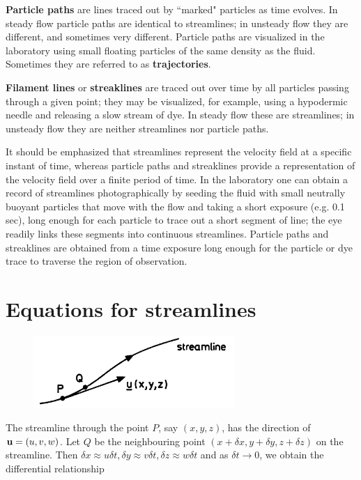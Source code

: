 \documentclass[twoside,a4paper,11pt]{report}
\begin{document}
\textbf{Particle paths} are lines traced out by ``marked" particles as time
evolves. In steady flow particle paths are identical to streamlines; in
unsteady flow they are different, and sometimes very different. Particle paths
are visualized in the laboratory using small floating particles of the same
density as the fluid. Sometimes they are referred to as \textbf{trajectories}.

\textbf{Filament lines} or \textbf{streaklines} are traced out over time by
all particles passing through a given point; they may be visualized, for
example, using a hypodermic needle and releasing a slow stream of dye. In
steady flow these are streamlines; in unsteady flow they are neither
streamlines nor particle paths.

It should be emphasized that streamlines represent the velocity field at a
specific instant of time, whereas particle paths and streaklines provide a
representation of the velocity field over a finite period of time. In the
laboratory one can obtain a record of streamlines photographically by seeding
the fluid with small neutrally buoyant particles that move with the flow and
taking a short exposure (e.g. 0.1 sec), long enough for each particle to trace
out a short segment of line; the eye readily links these segments into
continuous streamlines. Particle paths and streaklines are obtained from a
time exposure long enough for the particle or dye trace to traverse the region
of observation.

\section{Equations for streamlines}
\begin{figure}
\centerline{\includegraphics[width=3in]{Section4.pdf}}
\label{fig4}
\end{figure}

The streamline through the point $P$, say $(x,y,z)$, has the direction of
${\bf u} = (u,v,w)$. Let $Q$ be the neighbouring point $(x + \delta x, y +
\delta y, z + \delta z)$ on the streamline. Then $\delta x \approx u \delta t
, \delta y \approx v \delta t , \delta z \approx w \delta t$ and as $\delta t
\to 0$, we obtain the differential relationship
\end{document}
